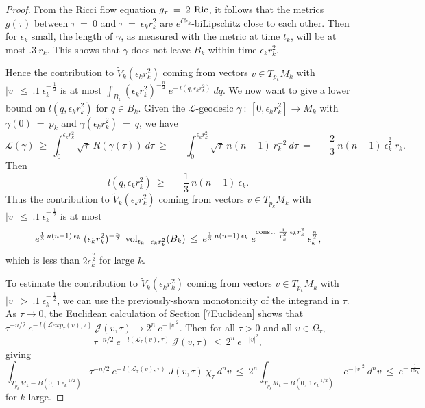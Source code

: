\begin{proof}
From the Ricci flow equation $g_\tau \: = \: 2 \: \operatorname{Ric}$, it follows
that the metrics $g(\tau)$ between $\tau \: = \: 0$ and
$\overline{\tau} \: = \: \epsilon_k r_k^2$
are $e^{C \epsilon_k}$-biLipschitz close to each other.  Then for
$\epsilon_k$ small,  the length
of $\gamma$, as measured with the metric at time $t_k$, will be at most
$.3 \: r_k$. This shows that $\gamma$ does not leave $B_k$ within
time $\epsilon_k r_k^2$.

Hence the contribution to $\tilde{V}_k(\epsilon_k r_k^2)$ coming from vectors
$v \in T_{p_k} M_k$
with $|v| \: \le \: .1 \: \epsilon_k^{- \: \frac12}$ is at most
$\int_{B_k} (\epsilon_k r_k^2)^{- \frac{n}{2}} \:
e^{- \: l(q, \epsilon_k r_k^2)} \: dq$.
We now want to give a lower
bound on $l(q, \epsilon_k r_k^2)$ for $q \in B_k$. Given the
${\mathcal L}$-geodesic $\gamma \: : \: [0, \epsilon_k r_k^2] \rightarrow M_k$
with $\gamma(0) \: = \: p_k$ and $\gamma(\epsilon_k r_k^2) \: = \: q$,
we have
\begin{equation}
{\mathcal L}(\gamma) \: \ge \: \int_0^{\epsilon_k r_k^2} \sqrt{\tau} \:
R(\gamma(\tau)) \: d\tau \: \ge \: - \:
\int_0^{\epsilon_k r_k^2} \sqrt{\tau} \:
n(n-1) \: r_k^{-2} \: d\tau \: = \: - \: \frac23 \: n(n-1) \:
\epsilon_k^{\frac32} \: r_k.
\end{equation}
Then
\begin{equation}
l(q, \epsilon_k r_k^2) \: \ge \: - \: \frac13 \: n(n-1) \: \epsilon_k.
\end{equation}
Thus the contribution to $\tilde{V}_k(\epsilon_k r_k^2)$ coming from vectors
$v \in T_{p_k}M_k$
with $|v| \: \le \: .1 \: \epsilon_k^{- \: \frac12}$ is at most
\begin{equation}
e^{\frac13 \: n(n-1) \: \epsilon_k} \:
(\epsilon_k r_k^2)^{- \frac{n}{2}} \: \operatorname{vol}_{t_k -
\epsilon_k r_k^2}(B_k) \: \le \:
e^{\frac13 \: n(n-1) \: \epsilon_k} \:
e^{\operatorname{const.} \: \frac{1}{r_k^2} \: \epsilon_k r_k^2} \:
\epsilon_k^{\frac{n}{2}},
\end{equation}
which is less than $2 \epsilon_k^{\frac{n}{2}}$ for large $k$.

To estimate
the contribution to $\tilde{V}_k(\epsilon_k r_k^2)$ coming from vectors
$v \in T_{p_k}M_k$ with $|v| \: > \: .1 \: \epsilon_k^{- \: \frac12}$, we
can use the previously-shown monotonicity of the integrand in $\tau$.
As $\tau \rightarrow 0$, the Euclidean calculation of Section \ref{7Euclidean}
shows that
$\tau^{- n/2} \: e^{- \:
l({\mathcal L} exp_\tau(v), \tau)} \:
{\mathcal J}(v, \tau) \rightarrow 2^n \: e^{- \: |v|^2}$.
Then for all $\tau > 0$ and all $v \in \Omega_\tau$,
\begin{equation}
\tau^{- n/2} \: e^{- \:
l({\mathcal L}_\tau(v), \tau)} \:
{\mathcal J}(v, \tau) \: \le \: 2^n \: e^{- \: |v|^2},
\end{equation}
giving
\begin{equation}
\int_{T_{p_k}M_k - B(0, .1 \: \epsilon_k^{-1/2})}
\tau^{- n/2} \: e^{- \: l({\mathcal L}_\tau(v), \tau)} \:
J(v, \tau) \: \chi_\tau \: d^nv \: \le \:
2^n \int_{T_{p_k}M_k - B(0, .1 \: \epsilon_k^{-1/2})}
\: e^{- \: |v|^2} \: d^nv \: \le \:
 e^{- \:  \frac{1}{10 \epsilon_k}}
\end{equation}
for $k$ large.


\end{proof}

